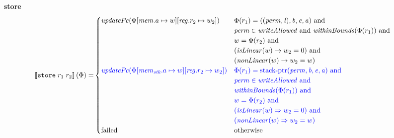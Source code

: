 \documentclass[a4paper]{article}
\newcommand{\sem}[1]{\left\llbracket #1 \right\rrbracket}
\newcommand{\tand}{\text{ and }}
\newcommand{\totherwise}{\text{otherwise }}
\newcommand{\sourcecolor}[1]{\color{blue}}
\newcommand{\src}[1]{{\sourcecolor{} #1}}
\newcommand{\targetcolor}[1]{\color{black}}
\newcommand{\trg}[1]{{\targetcolor{} #1}}
\newcommand{\zinstr}[1]{\texttt{#1}}
\newcommand{\twoinstr}[3]{
  \ifthenelse{\equal{#2#3}{}}
  {\zinstr{#1}}
  {\zinstr{#1} \; #2 \; #3}
}
\newcommand{\tstore}[2]{\twoinstr{\trg{store}}{#1}{#2}}
\newcommand{\update}[2]{[#1 \mapsto #2]}
\newcommand{\perm}{\var{perm}}
\newcommand{\lin}{\var{l}}
\newcommand{\stkptr}[1]{\mathrm{stack\text{-}ptr}(#1)}
\newcommand{\failed}{\mathrm{failed}}
\newcommand{\var}[1]{\mathit{#1}}
\newcommand{\reg}{\var{reg}}
\newcommand{\mem}{\var{mem}}
\newcommand{\stk}{\var{stk}}
\newcommand{\baddr}{\var{b}}
\newcommand{\eaddr}{\var{e}}
\newcommand{\aaddr}{\var{a}}
\newcommand{\plainfun}[2]{
  \ifthenelse{\equal{#2}{}}
  {\mathit{#1}}
  {\mathit{#1}(#2)}
}
\newcommand{\updPcAddr}[1]{\plainfun{updatePc}{#1}}
\newcommand{\writeAllowed}[1]{\plainfun{writeAllowed}{#1}}
\newcommand{\nonLinear}[1]{\plainfun{nonLinear}{#1}}
\newcommand{\isLinear}[1]{\plainfun{isLinear}{#1}}
\newcommand{\withinBounds}[1]{\plainfun{withinBounds}{#1}}
\begin{document}
\noindent\textbf{store}\\
\begin{align*}
  \sem{\tstore{r_1}{r_2}}(\Phi) = &
                                    \begin{cases}
                                      \updPcAddr{\Phi\update{\mem.a}{w}\update{\reg.r_2}{w_2}} & 
                                      \arraycolsep=0pt
                                      \begin{array}[t]{l}
                                        \Phi(r_1) = ((\perm,\lin),\baddr,\eaddr,\aaddr) \tand \\
                                        \perm \in \writeAllowed{} \tand \withinBounds{\Phi(r_1)} \tand \\
                                        w = \Phi(r_2) \tand \\
                                        (\isLinear{w} \rightarrow w_2 = 0) \tand \\
                                        (\nonLinear{w} \rightarrow w_2 = w)
                                      \end{array}
                                      \\
                                      \src{\updPcAddr{\Phi\update{\mem_\stk.a}{w}\update{\reg.r_2}{w_2}}} & 
                                      \arraycolsep=0pt
                                      \begin{array}[t]{l}
                                        \src{\Phi(r_1) = \stkptr{\perm,\baddr,\eaddr,\aaddr} \tand} \\
                                        \src{\perm \in \writeAllowed{} \tand} \\
                                        \src{\withinBounds{\Phi(r_1)} \tand} \\
                                        \src{w = \Phi(r_2) \tand} \\
                                        \src{(\isLinear{w} \Rightarrow w_2 = 0) \tand} \\
                                        \src{(\nonLinear{w} \Rightarrow w_2 = w)}
                                      \end{array}\\
                                      \failed & \totherwise
                                    \end{cases}
\end{align*}
\end{document}
